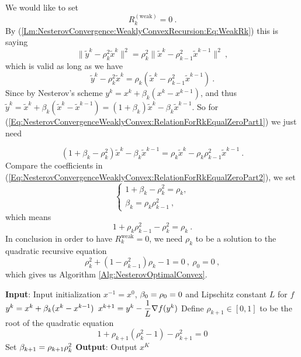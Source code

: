 We would like to set $$R_k^{(\mathrm{weak})}=0 \ .$$
By (\ref{Lm:NesterovConvergence:WeaklyConvexRecursion:Eq:WeakRk}) this is saying 
$$\|\tilde y^k-\rho_k^2\tilde x^k\|^2
=
\rho_k^2\|\tilde x^k-\rho_{k-1}^2\tilde x^{k-1}\|^2 \ ,
$$
which is valid as long as we have
\begin{equation}\label{Eq:NesterovConvergenceWeaklyConvex:RelationForRkEqualZeroPart1}
\tilde y^k-\rho_k^2\tilde x^k
=
\rho_k(\tilde x^k-\rho_{k-1}^2\tilde x^{k-1}) \ .
\end{equation}
Since by Nesterov's scheme
$
y^k=x^k+\beta_k(x^k-x^{k-1})
$, and thus
$\tilde y^k
=
\tilde x^k+\beta_k(\tilde x^k-\tilde x^{k-1})
=
(1+\beta_k)\tilde x^k-\beta_k\tilde x^{k-1}
$. So for (\ref{Eq:NesterovConvergenceWeaklyConvex:RelationForRkEqualZeroPart1}) we just need

\begin{equation}\label{Eq:NesterovConvergenceWeaklyConvex:RelationForRkEqualZeroPart2}
(1+\beta_k-\rho_k^2)\tilde x^k-\beta_k\tilde x^{k-1}
=
\rho_k\tilde x^k-\rho_k\rho_{k-1}^2\tilde x^{k-1} \ .
\end{equation}
Compare the coefficients in (\ref{Eq:NesterovConvergenceWeaklyConvex:RelationForRkEqualZeroPart2}), we set
\[
\begin{cases}
1+\beta_k-\rho_k^2=\rho_k,\\[2mm]
\beta_k=\rho_k\rho_{k-1}^2 \ ,
\end{cases}
\]
which means
\[
1+\rho_k\rho_{k-1}^2-\rho_k^2=\rho_k \ .
\]
In conclusion in order to have $R_k^{\text{weak}}=0$, we need $\rho_k$ to be a solution to the quadratic recursive equation
\begin{equation}\label{Eq:NesterovConvergenceWeaklyConvex:RelationForRkEqualZeroPartFinal}
\rho_k^2+(1-\rho_{k-1}^2)\rho_k-1=0 \ , \
\rho_0=0 \ ,
\end{equation}
which gives us Algorithm \ref{Alg:NesterovOptimalConvex}.

\begin{algorithm}[H]
\caption{Nesterov's optimal algorithm for general convex function $f$}
\label{Alg:NesterovOptimalConvex}
\begin{algorithmic}[1]
\STATE \textbf{Input}: Input initialization $x^{-1}=x^0$, $\beta_0=\rho_0=0$ and Lipschitz constant $L$ for $f$
\FOR {$k=0,1,2,...,K-1$}
    \STATE $y^k=x^k+\beta_k(x^k-x^{k-1})$
    \STATE $x^{k+1}=y^k-\dfrac{1}{L} \nabla f(y^k)$
    \STATE Define $\rho_{k+1}\in [0,1]$ to be the root of the quadratic equation $$1+\rho_{k+1}(\rho_k^2-1)-\rho_{k+1}^2=0$$
    \STATE Set $\beta_{k+1}=\rho_{k+1}\rho_k^2$
\ENDFOR
\STATE \textbf{Output}: Output $x^K$
\end{algorithmic}
\end{algorithm}

